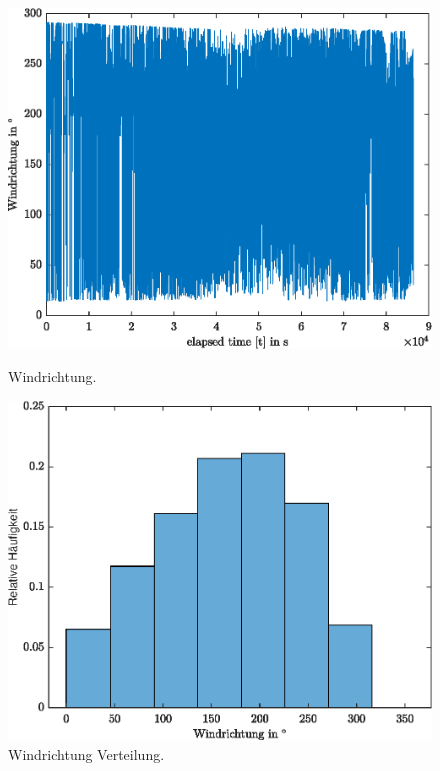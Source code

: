 \begin{figure}[H]
	\centering
	\begin{minipage}[t]{0.4\textwidth}
		\centering
		\includegraphics[width=\textwidth]{../DATA/Windrichtung.eps}
		\caption[Windrichtung]{Windrichtung.}
		\label{fig:winddir}
	\end{minipage}
	\hfill
	\begin{minipage}[t]{0.4\textwidth}
		\centering
		\centering
		\includegraphics[width=\textwidth]{../DATA/WinddirCN.eps}
		\caption[Windrichtung Verteilung]{Windrichtung Verteilung.}
		\label{fig:winddirCN}
	\end{minipage}
\end{figure}

